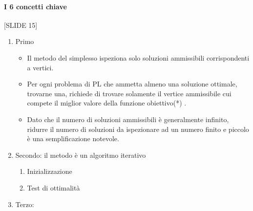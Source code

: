 \documentclass[12pt, a4paper, openany]{book}
\begin{document}
\paragraph*{I 6 concetti chiave} [SLIDE 15]
\begin{enumerate}
    \item Primo
        \begin{itemize}
            \item Il metodo del simplesso ispeziona solo
            soluzioni ammissibili corrispondenti a
            vertici.
            \item Per ogni problema di PL che ammetta
            almeno una soluzione ottimale, trovarne
            una, richiede di trovare solamente il vertice
            ammissibile cui compete il miglior valore
            della funzione obiettivo(*)
            .
            \item Dato che il numero di soluzioni ammissibili
            è generalmente infinito, ridurre il numero
            di soluzioni da ispezionare ad un numero
            finito e piccolo è una semplificazione
            notevole.
        \end{itemize}
    \item Secondo: il metodo è un algoritmo iterativo
    \begin{enumerate}
        \item Inizializzazione
        \item Test di ottimalità
    \end{enumerate}
    \item Terzo: 
\end{enumerate}
 
\end{document}
